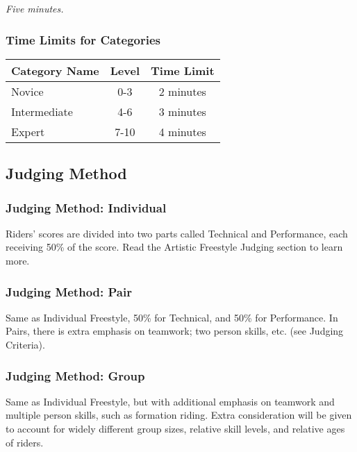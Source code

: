 \textit{Five minutes.}

\subsubsection{Time Limits for Categories}

\begin{tabular}{|l|c|c|}
\hline
\textbf{Category Name} & \textbf{Level} & \textbf{Time Limit} \\
\hline
Novice & 0-3 & 2 minutes \\
\hline
Intermediate & 4-6 & 3 minutes \\
\hline
Expert & 7-10 & 4 minutes \\
\hline
\end{tabular}
 
\subsection{Judging Method}

\subsubsection{Judging Method: Individual}
Riders' scores are divided into two parts called Technical and Performance, each receiving 50\% of the score.
Read the Artistic Freestyle Judging section to learn more.

\subsubsection{Judging Method: Pair}
Same as Individual Freestyle, 50\% for Technical, and 50\% for Performance.
In Pairs, there is extra emphasis on teamwork; two person skills, etc.
(see Judging Criteria).

\subsubsection{Judging Method: Group}
Same as Individual Freestyle, but with additional emphasis on teamwork and multiple person skills, such as formation riding.
Extra consideration will be given to account for widely different group sizes, relative skill levels, and relative ages of riders.

